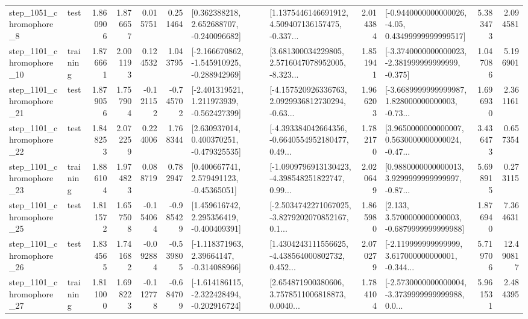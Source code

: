 \begin{tabular}{llrrrrllrlrr}
  step\_1051\_chromophore\_8 &      test &      1.860906 &    1.876657 &      0.015751 &  0.251464 &    [0.362388218, 2.652688707, -0.240096682] &  [1.1375446146691912, 4.509407136157475, -0.337... &       2.014384 &  [-0.9440000000000026, -4.05, 0.43499999999999517] &            5.383473 &          2.094581 \\
 step\_1101\_chromophore\_10 &  training &      1.876661 &    2.001193 &      0.124532 &  1.043795 &  [-2.166670862, -1.545910925, -0.288942969] &  [3.681300034229805, 2.5716047078952005, -8.323... &       1.851941 &  [-3.3740000000000023, -2.381999999999999, -0.375] &            1.047086 &          5.196901 \\
 step\_1101\_chromophore\_21 &      test &      1.879056 &    1.757904 &     -0.121152 & -0.745702 &   [-2.401319521, 1.211973939, -0.562427399] &  [-4.157520926336763, 2.0929936812730294, -0.63... &       1.966203 &  [-3.6689999999999987, 1.828000000000003, -0.73... &            1.696930 &          2.361161 \\
 step\_1101\_chromophore\_22 &      test &      1.848253 &    2.072259 &      0.224006 &  1.768344 &    [2.630937014, 0.400370251, -0.479325535] &  [-4.393384042664356, -0.6640554952180477, 0.49... &       1.782170 &  [3.9650000000000007, 0.5630000000000024, -0.47... &            3.436473 &          0.657354 \\
 step\_1101\_chromophore\_23 &  training &      1.886104 &    1.974823 &      0.088719 &  0.782947 &     [0.400667741, 2.579491123, -0.45365051] &  [-1.0909796913130423, -4.398548251822747, 0.99... &       2.020649 &  [0.9880000000000013, 3.9299999999999997, -0.87... &            5.698915 &          0.273115 \\
 step\_1101\_chromophore\_25 &      test &      1.811572 &    1.657508 &     -0.154064 & -0.985429 &    [1.459616742, 2.295356419, -0.400409391] &  [-2.5034742271067025, -3.8279202070852167, 0.1... &       1.865980 &   [2.133, 3.5700000000000003, -0.6879999999999988] &            1.876940 &          7.364631 \\
 step\_1101\_chromophore\_26 &      test &      1.834565 &    1.741682 &     -0.092884 & -0.539805 &    [-1.118371963, 2.39664147, -0.314088966] &  [1.4304243111556625, -4.438564000802732, 0.452... &       2.070279 &  [-2.119999999999999, 3.617000000000001, -0.344... &            5.719706 &         12.490817 \\
 step\_1101\_chromophore\_27 &  training &      1.811000 &    1.698223 &     -0.112778 & -0.684709 &  [-1.614186115, -2.322428494, -0.202916724] &  [2.654871900380606, 3.7578511006818873, 0.0040... &       1.784104 &  [-2.5730000000000004, -3.3739999999999988, 0.0... &            5.961531 &          2.484395 \\

\end{tabular}
